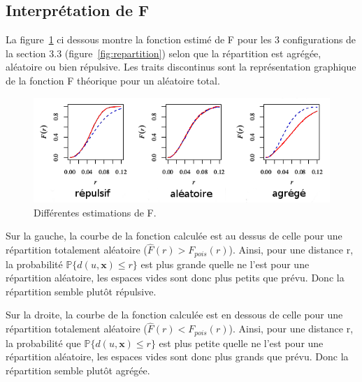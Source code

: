 \documentclass[stage2a]{tnreport}
\begin{document}

\subsection*{Interprétation de F}

La figure~\ref{fig:interpretF} ci dessous montre la fonction estimé de F pour les 3 configurations de la section 3.3 (figure~\ref{fig:repartition}) selon que la répartition est agrégée, aléatoire ou bien répulsive. Les traits discontinus sont la représentation graphique de la fonction F théorique pour un aléatoire total.

\begin{figure}[h]
  \centering
  \includegraphics[scale=0.7]{figures/interpretF2.png}
  \caption{Différentes estimations de F.}
  \label{fig:interpretF}
\end{figure}

Sur la gauche, la courbe de la fonction calculée est au dessus de celle pour une répartition totalement aléatoire (\begin{math}\hat{F}(r) > F_{pois}(r) \end{math}). Ainsi, pour une distance r, la probabilité  \begin{math} \mathbb{P}\{d(u,\textbf{x}) \leq r\} \end{math} est plus grande quelle ne l'est pour une répartition aléatoire, les espaces vides sont donc plus petits que prévu. Donc la répartition semble plutôt répulsive.

Sur la droite, la courbe de la fonction calculée est en dessous de celle pour une répartition totalement aléatoire (\begin{math}\hat{F}(r) < F_{pois}(r) \end{math}). Ainsi, pour une distance r, la probabilité que \begin{math} \mathbb{P}\{d(u,\textbf{x}) \leq r\} \end{math} est plus petite quelle ne l'est pour une répartition aléatoire, les espaces vides sont donc plus grands que prévu. Donc la répartition semble plutôt agrégée.
\end{document}
